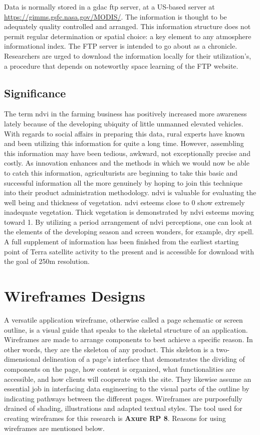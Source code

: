 Data is normally stored in a \gls{gdac} \gls{ftp} server, at a US-based server at \url{https://gimms.gsfc.nasa.gov/MODIS/}. The information is thought to be adequately quality controlled and arranged. This information structure does not permit regular determination or spatial choice: a key element to any atmosphere informational index. The FTP server is intended to go about as a chronicle. Researchers are urged to download the information locally for their utilization's, a procedure that depends on noteworthy space learning of the FTP website.

\subsection{Significance}

The term \gls{ndvi} in the farming business has positively increased more awareness lately because of the developing ubiquity of little unmanned elevated vehicles. With regards to social affairs in preparing this data, rural experts have known and been utilizing this information for quite a long time. However, assembling this information may have been tedious, awkward, not exceptionally precise and costly. As innovation enhances and the methods in which we would now be able to catch this information, agriculturists are beginning to take this basic and successful information all the more genuinely by hoping to join this technique into their product administration methodology. 
\gls{ndvi} is valuable for evaluating the well being and thickness of vegetation. \gls{ndvi} esteems close to 0 show extremely inadequate vegetation. Thick vegetation is demonstrated by \gls{ndvi} esteems moving toward 1. By utilizing a period arrangement of \gls{ndvi} perceptions, one can look at the elements of the developing season and screen wonders, for example, dry spell. A full supplement of information has been finished from the earliest starting point of Terra satellite activity to the present and is accessible for download with the goal of 250m resolution.

\section{Wireframes Designs}

A versatile application wireframe, otherwise called a page schematic or screen outline, is a visual guide that speaks to the skeletal structure of an application. Wireframes are made to arrange components to best achieve a specific reason. In other words, they are the skeleton of any product. This skeleton is a two-dimensional delineation of a page's interface that demonstrates the dividing of components on the page, how content is organized, what functionalities are accessible, and how clients will cooperate with the site. They likewise assume an essential job in interfacing data engineering to the visual parts of the outline by indicating pathways between the different pages. Wireframes are purposefully drained of shading, illustrations and adapted textual styles. The tool used for creating wireframes for this research is \textbf{Axure RP 8}. Reasons for using wireframes are mentioned below.

